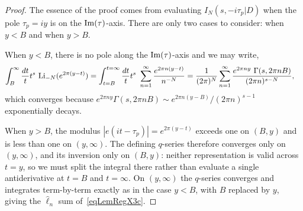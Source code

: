 \documentclass[11pt,a4paper]{article}
\newcommand{\G}{\Gamma}
\begin{document}
\begin{proof}
The essence of the proof comes from evaluating $I_N(s,-i \tau_p|D)$ when the pole $\tau_p = i y$ is on the ${\rm Im}(\tau)$-axis. There are only two cases to consider: when $y < B$ and when $y > B$.

When $y < B$, there is no pole along the ${\rm Im}(\tau)$-axis and we may write,
\begin{align}
\int_{B}^{\infty} \frac{dt}{t} t^s~{\rm Li}_{-N}(e^{2 \pi(y-t)}) &= 
\int_{t = B}^{t = \infty} \frac{dt}{t} t^s~\sum_{n = 1}^{\infty} \frac{e^{2 \pi n(y-t)} }{n^{-N}} = \frac{1}{(2\pi)^N}\sum_{n = 1}^{\infty} \frac{e^{2 \pi n y}~\G(s,2\pi n B) }{(2 \pi n)^{s-N}},
\end{align}
which converges because $e^{2 \pi n y}\G(s,2 \pi n B) \sim e^{2 \pi n(y-B)}/(2\pi n)^{s-1}$ exponentially decays.

When $y > B$, the modulus $|e(it-\tau_p)| = e^{2\pi(y-t)}$ exceeds one on $(B,y)$ and is less than
one on $(y,\infty)$. The defining $q$-series therefore converges only on $(y,\infty)$, and its
inversion only on $(B,y)$: neither representation is valid across $t = y$, so we must split the
integral there rather than evaluate a single antiderivative at $t = B$ and $t = \infty$. On
$(y,\infty)$ the $q$-series converges and integrates term-by-term exactly as in the case $y<B$,
with $B$ replaced by $y$, giving the $\hat\ell_n$ sum of~\eqref{eqLemRegX3c}.


\end{proof}
\end{document}
